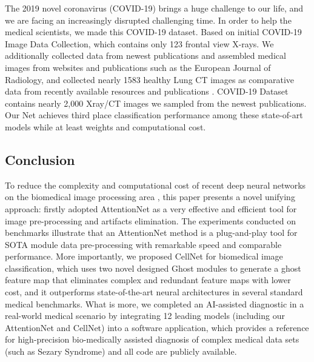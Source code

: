 The 2019 novel coronavirus (COVID-19) brings a huge challenge to our life, and we are facing an increasingly disrupted challenging time. In order to help the medical scientists, we made this COVID-19 dataset. Based on initial COVID-19 Image Data Collection\cite{37}, which contains only 123 frontal view X-rays. We additionally collected data from newest publications and assembled medical images from websites and publications such as the European Journal of Radiology\cite{36}, and collected nearly 1583 healthy Lung CT images as comparative data from recently available resources and publications\cite{37} \cite{38}. COVID-19 Dataset contains nearly 2,000 Xray/CT images we sampled from the newest publications. Our Net achieves third place classification performance among these state-of-art models while at least weights and computational cost.




\subsection*{Conclusion}
To reduce the complexity and computational cost of recent deep neural networks on the biomedical image processing area \cite{3}\cite{15}\cite{17}, this paper presents a novel unifying approach: firstly adopted AttentionNet as a very effective and efficient tool for image pre-processing and artifacts elimination. The experiments conducted on benchmarks illustrate that an AttentionNet method is a plug-and-play tool for SOTA module data pre-processing with remarkable speed and comparable performance. More importantly, we proposed CellNet for biomedical image classification, which uses two novel designed Ghost modules to generate a ghost feature map that eliminates complex and redundant feature maps with lower cost, and it outperforms state-of-the-art neural architectures in several standard medical benchmarks.
What is more, we completed an AI-assisted diagnostic in a real-world medical scenario by integrating 12 leading models (including our AttentionNet and CellNet) into a software application, which provides a reference for high-precision bio-medically assisted diagnosis of complex medical data sets (such as Sezary Syndrome) and all code are publicly available.





